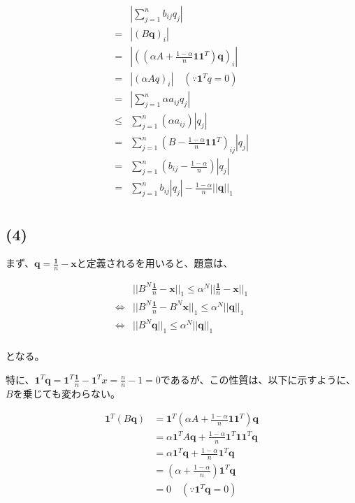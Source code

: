 \documentclass[a4paper, 10pt, dvipdfmx]{jlreq}
\begin{document}
\begin{align*}
         & \left|\sum_{j=1}^nb_{ij}q_j\right|                                            \\
    =    & |(B\bm{q})_i|                                                                 \\
    =    & \left|\left((\alpha A+\frac{1-\alpha}{n}\bm{1}\bm{1}^T)\bm{q}\right)_i\right| \\
    =    & \left|(\alpha Aq)_i\right| \quad (\because \bm{1}^Tq=0)                       \\
    =    & \left|\sum_{j=1}^n\alpha a_{ij}q_j\right|                                     \\
    \leq & \sum_{j=1}^n(\alpha a_{ij})|q_j|                                              \\
    =    & \sum_{j=1}^n \left(B-\frac{1-\alpha}{n}\bm{1}\bm{1}^T\right)_{ij}|q_j|        \\
    =    & \sum_{j=1}^n \left(b_{ij}-\frac{1-\alpha}{n}\right)|q_j|                      \\
    =    & \sum_{j=1}^n b_{ij}|q_j|-\frac{1-\alpha}{n}||\bm{q}||_1                       \\
\end{align*}

\subsection*{(4)}

まず、$\bm{q}=\frac{\bm{1}}{n}-\bm{x}$と定義されるを用いると、題意は、

\begin{align*}
                    & ||B^N\frac{\bm{1}}{n}-\bm{x}||_1 \leq \alpha^N ||\frac{\bm{1}}{n}-\bm{x}||_1 \\
    \Leftrightarrow & ||B^N\frac{\bm{1}}{n}-B^N\bm{x}||_1 \leq \alpha^N ||\bm{q}||_1               \\
    \Leftrightarrow & ||B^N\bm{q}||_1 \leq \alpha^N ||\bm{q}||_1                                   \\
\end{align*}

となる。

特に、$\bm{1}^T\bm{q}=\bm{1}^T\frac{\bm{1}}{n}-\bm{1}^Tx=\frac{n}{n}-1=0$であるが、この性質は、以下に示すように、$B$を乗じても変わらない。

\begin{align*}
    \bm{1}^T(B\bm{q}) & =\bm{1}^T \left(\alpha A+\frac{1-\alpha}{n}\bm{1}\bm{1}^T\right)\bm{q} \\
                      & =\alpha \bm{1}^TA\bm{q}+\frac{1-\alpha}{n}\bm{1}^T\bm{1}\bm{1}^T\bm{q} \\
                      & =\alpha \bm{1}^T\bm{q}+\frac{1-\alpha}{n}\bm{1}^T\bm{q}                \\
                      & =\left(\alpha+\frac{1-\alpha}{n}\right)\bm{1}^T\bm{q}                  \\
                      & =0 \quad (\because \bm{1}^T\bm{q}=0)
\end{align*}
\end{document}
